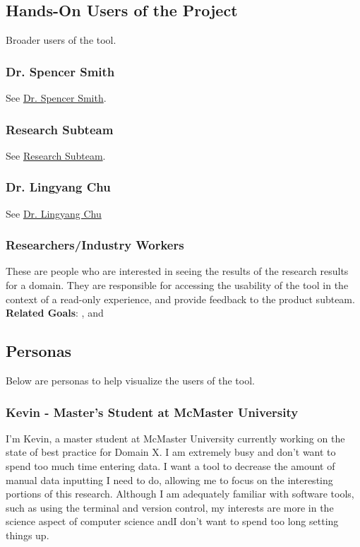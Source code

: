 \documentclass[12pt]{article}
\begin{document}
\subsection{Hands-On Users of the Project}
Broader users of the tool.
\subsubsection{Dr. Spencer Smith}
See \hyperref[smith]{Dr. Spencer Smith}.
\subsubsection{Research Subteam}
See \hyperref[research_team]{Research Subteam}.
\subsubsection{Dr. Lingyang Chu}
See \hyperref[chu]{Dr. Lingyang Chu}
\subsubsection{Researchers/Industry Workers}
These are people who are interested in seeing the results of the research results for a domain. They are responsible for accessing the usability of the tool in the context of a read-only experience, and provide feedback to the product subteam. \\
\textbf{Related Goals}: ,  and 

\subsection{Personas}
Below are personas to help visualize the users of the tool.
\subsubsection{Kevin - Master's Student at McMaster University}
I’m Kevin, a master student at McMaster University currently working on the state of best practice for Domain X. I am extremely busy and don’t want to spend too much time entering data. I want a tool to decrease the amount of manual data inputting I need to do, allowing me to focus on the interesting portions of this research. Although I am adequately familiar with software tools, such as using the terminal and version control, my interests are more in the science aspect of computer science andI don’t want to spend too long setting things up.
\end{document}
